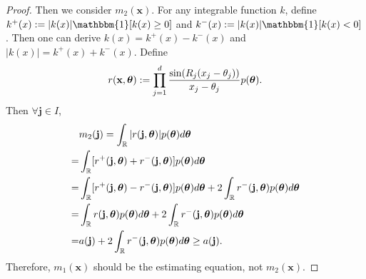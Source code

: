 \documentclass[%
 reprint,
 amsmath,amssymb,
 aps,
]{revtex4-2}
\def\R{\mathbb{R}}
\def\xbold{\mathbf{x}}
\newcommand{\btheta}{\mbox{\boldmath $\theta$}}
\begin{document}
\begin{proof}
    Then we consider $m_2(\xbold)$. For any integrable function $k$, define $k^+(x) := |k(x)|\mathbbm{1}[k(x) \ge 0]$ and $k^-(x) := |k(x)|\mathbbm{1}[k(x) < 0]$. Then one can derive $k(x) = k^+(x) - k^-(x)$ and $|k(x)| = k^+(x) + k^-(x)$. Define
    \begin{equation*}
        r(\xbold, \btheta) := \prod_{j = 1}^d \frac{\sin(R_j(x_j - \theta_j))}{x_j - \theta_j} p(\btheta).
    \end{equation*}
    Then $\forall \mathbf{j} \in I$,
    \begin{align*}
        & m_2(\mathbf{j}) = \int_\R |r(\mathbf{j}, \btheta)|p(\btheta)d\btheta \\
        = & \int_\R [r^+(\mathbf{j}, \btheta) + r^-(\mathbf{j}, \btheta)]p(\btheta)d\btheta \\
        = & \int_\R [r^+(\mathbf{j}, \btheta) - r^-(\mathbf{j}, \btheta)]p(\btheta)d\btheta + 2\int_\R r^-(\mathbf{j}, \btheta)p(\btheta)d\btheta \\
        = & \int_\R r(\mathbf{j}, \btheta)p(\btheta)d\btheta + 2\int_\R r^-(\mathbf{j}, \btheta)p(\btheta)d\btheta \\
        = & a(\mathbf{j}) + 2\int_\R r^-(\mathbf{j}, \btheta)p(\btheta)d\btheta \ge a(\mathbf{j}).
    \end{align*}
Therefore, $m_1(\xbold)$ should be the estimating equation, not $m_2(\xbold)$.
\end{proof}
\end{document}
